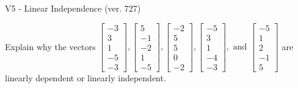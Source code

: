 \begin{exercise}
  \begin{exerciseTitle}V5 - Linear Independence (ver. 727)\end{exerciseTitle}
  \begin{exerciseStatement}
    Explain why the vectors \(\left[\begin{array}{r}
-3 \\
3 \\
1 \\
-5 \\
-3
\end{array}\right] , \left[\begin{array}{r}
5 \\
-1 \\
-2 \\
1 \\
-5
\end{array}\right] , \left[\begin{array}{r}
-2 \\
5 \\
5 \\
0 \\
-2
\end{array}\right] , \left[\begin{array}{r}
-5 \\
3 \\
1 \\
-4 \\
-3
\end{array}\right] , \text{ and } \left[\begin{array}{r}
-5 \\
1 \\
2 \\
-1 \\
5
\end{array}\right]\) are linearly dependent or linearly independent.	



\end{exerciseStatement}
\end{exercise}
